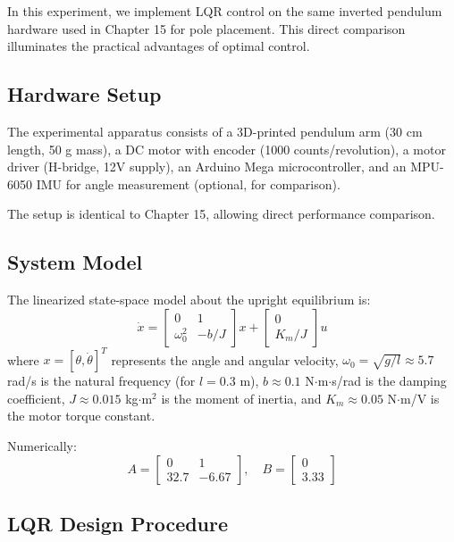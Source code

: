 In this experiment, we implement LQR control on the same inverted pendulum hardware used in Chapter 15 for pole placement. This direct comparison illuminates the practical advantages of optimal control.

\subsection{Hardware Setup}

The experimental apparatus consists of a 3D-printed pendulum arm (30 cm length, 50 g mass), a DC motor with encoder (1000 counts/revolution), a motor driver (H-bridge, 12V supply), an Arduino Mega microcontroller, and an MPU-6050 IMU for angle measurement (optional, for comparison).

The setup is identical to Chapter 15, allowing direct performance comparison.

\subsection{System Model}

The linearized state-space model about the upright equilibrium is:
\begin{equation}
\dot{x} = \begin{bmatrix} 0 & 1 \\ \omega_0^2 & -b/J \end{bmatrix} x + \begin{bmatrix} 0 \\ K_m/J \end{bmatrix} u
\end{equation}
where $x = [\theta, \dot{\theta}]^T$ represents the angle and angular velocity, $\omega_0 = \sqrt{g/l} \approx 5.7$ rad/s is the natural frequency (for $l = 0.3$ m), $b \approx 0.1$ N$\cdot$m$\cdot$s/rad is the damping coefficient, $J \approx 0.015$ kg$\cdot$m$^2$ is the moment of inertia, and $K_m \approx 0.05$ N$\cdot$m/V is the motor torque constant.

Numerically:
\begin{equation}
A = \begin{bmatrix} 0 & 1 \\ 32.7 & -6.67 \end{bmatrix}, \quad B = \begin{bmatrix} 0 \\ 3.33 \end{bmatrix}
\end{equation}

\subsection{LQR Design Procedure}

